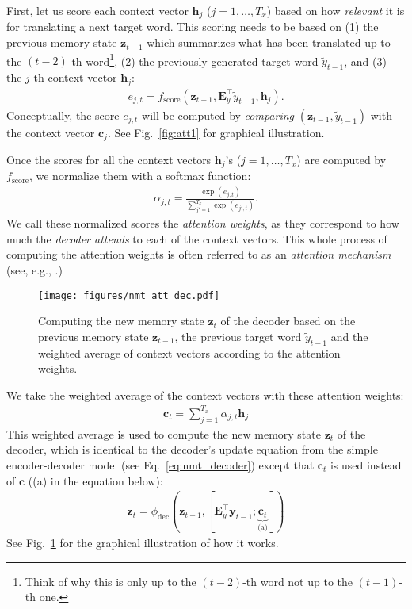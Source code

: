 \documentclass{report}
\newcommand{\vect}[1]{\mathbf{#1}}
\newcommand{\matr}[1]{\mathbf{#1}}
\newcommand{\vc}[0]{\vect{c}}
\newcommand{\vh}[0]{\vect{h}}
\newcommand{\vz}[0]{\vect{z}}
\newcommand{\vy}[0]{\vect{y}}
\newcommand{\mE}[0]{\matr{E}}
\newcommand{\dec}{\text{dec}}
\begin{document}
First, let us score each context vector $\vh_j$ ($j=1, \ldots, T_x$) based on
how {\em relevant} it is for translating a next target word. This scoring needs
to be based on (1) the previous memory state $\vz_{t-1}$ which summarizes what
has been translated up to the $(t-2)$-th word\footnote{
    Think of why this is only up to the $(t-2)$-th word not up to the $(t-1)$-th
    one.
}, (2) the previously generated target word $\tilde{y}_{t-1}$, and (3) the
$j$-th context vector $\vh_j$: 
\begin{align}
    \label{eq:nmt_score}
    e_{j, t} = f_{\text{score}}(\vz_{t-1}, \mE_y^\top \tilde{y}_{t-1}, \vh_j).
\end{align}
Conceptually, the score $e_{j,t}$ will be computed by {\em comparing}
$(\vz_{t-1}, \tilde{y}_{t-1})$ with the context vector $\vc_j$. See
Fig.~\ref{fig:att1} for graphical illustration.

Once the scores for all the context vectors $\vh_j$'s ($j=1, \ldots, T_x$) are
computed by $f_{\text{score}}$, we normalize them with a softmax function:
\begin{align}
    \label{eq:att_weight}
    \alpha_{j, t} = \frac{\exp(e_{j,t})}{\sum_{j'=1}^{T_x} \exp(e_{j',t})}.
\end{align}
We call these normalized scores the {\em attention weights}, as they correspond
to how much the {\em decoder attends} to each of the context vectors. This whole
process of computing the attention weights is often referred to as an {\em
attention mechanism} (see, e.g., \cite{cho2015describing}.)

\begin{figure}[t]
    \centering
    \centering
    \texttt{[image: figures/nmt\_att\_dec.pdf]}

    \caption{Computing the new memory state $\vz_t$ of the decoder based on the
        previous memory state $\vz_{t-1}$, the previous target word
    $\tilde{y}_{t-1}$ and the weighted average of context vectors according to
the attention weights.}
    \label{fig:att2}
\end{figure}

We take the weighted average of the context vectors with these attention
weights:
\begin{align}
    \label{eq:td_context}
    \vc_t = \sum_{j=1}^{T_x} \alpha_{j, t} \vh_j
\end{align}
This weighted average is used to compute the new memory state $\vz_t$ of the
decoder, which is identical to the decoder's update equation from the simple
encoder-decoder model (see Eq.~\eqref{eq:nmt_decoder}) except that $\vc_t$ is
used instead of $\vc$ ((a) in the equation below):
\begin{align*}
    \vz_t = \phi_{\dec}\left( \vz_{t-1}, \left[ \mE_y^\top \vy_{t-1};
            \underbrace{\vc_t}_{\text{(a)}}
    \right]\right)
\end{align*}
See Fig.~\ref{fig:att2} for the graphical illustration of how it works.
\end{document}
